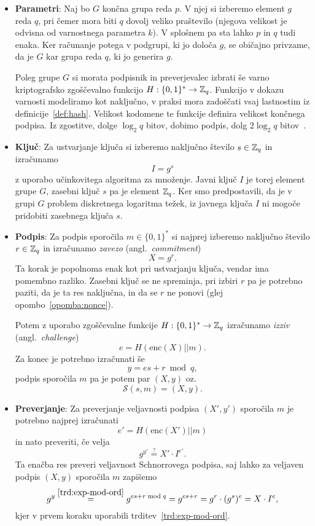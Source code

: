 \begin{itemize}
    \item \textbf{Parametri}:
    Naj bo $G$ končna grupa reda $p$. V njej si izberemo element $g$ reda $q$, pri čemer mora
    biti $q$ dovolj veliko praštevilo (njegova velikost je odvisna od varnostnega parametra $k$).
    V splošnem pa sta lahko $p$ in $q$ tudi enaka. Ker računanje potega v podgrupi, ki jo določa $g$,
    se običajno privzame, da je $G$ kar grupa reda $q$, ki jo generira $g$.

    Poleg grupe $G$ si morata podpisnik in preverjevalec izbrati še varno kriptografsko zgoščevalno
    funkcijo $H : \{0, 1\}^* \rightarrow \mathbb Z_q$. Funkcijo v dokazu varnosti modeliramo kot naključno,
    v praksi mora zadoščati vsaj lastnostim iz definicije~\ref{def:hash}. Velikost kodomene te funkcije
    definira velikost končnega podpisa. Iz zgostitve, dolge $\log_2 q$ bitov, dobimo podpis, dolg
    $2 \log_2 q$ bitov~\cite{stinson2023crypto}.
    \item \textbf{Ključ}:
    Za ustvarjanje ključa si izberemo naključno število $s \in \mathbb Z_q$ in izračunamo
    $$
    I = g^s
    $$
    z uporabo učinkovitega algoritma za množenje. Javni ključ $I$ je torej element grupe $G$, zasebni ključ
    $s$ pa je element $\mathbb Z_q$. Ker smo predpostavili, da je v grupi $G$ problem diskretnega logaritma
    težek, iz javnega ključa $I$ ni mogoče pridobiti zasebnega ključa $s$.

    \item \textbf{Podpis}:
    Za podpis sporočila $m \in \{0, 1\}^*$ si najprej izberemo naključno število $r \in \mathbb Z_q$ in izračunamo
    \textit{zavezo} (angl.\ \textit{commitment})
    $$
    X = g^r.
    $$
    Ta korak je popolnoma enak kot pri ustvarjanju ključa, vendar ima pomembno razliko. Zasebni
    ključ se ne spreminja, pri izbiri $r$ pa je potrebno paziti, da je ta res naključna, in da se
    $r$ ne ponovi (glej opombo~\ref{opomba:nonce}).

    Potem z uporabo zgoščevalne funkcije $H : \{0, 1\}^* \rightarrow \mathbb Z_q$ izračunamo \textit{izziv}
    (angl.\ \textit{challenge})
    $$
    e = H(\text{enc}(X) || m).
    $$
    Za konec je potrebno izračunati še
    $$ 
    y = es + r \bmod q,
    $$
    podpis sporočila $m$ pa je potem par $(X, y)$ oz.\
    $$ 
    \mathcal{S}(s, m) = (X, y).
    $$

    \item \textbf{Preverjanje}:
    Za preverjanje veljavnosti podpisa $(X', y')$ sporočila $m$ je potrebno najprej izračunati
    $$
    e' = H(\text{enc}(X') || m)
    $$
    in nato preveriti, če velja
    \begin{equation}
        g^{y'} \stackrel{?}{=} X' \cdot I^{e'}. \label{eq:gen-schnorr-ver}
    \end{equation}
    Ta enačba res preveri veljavnost Schnorrovega podpisa, saj lahko za veljaven podpis $(X, y)$
    sporočila $m$ zapišemo
    $$
    g^y \stackrel{\ref{trd:exp-mod-ord}}{=} g^{es + r \bmod q} = g^{es + r} = g^r \cdot (g^s)^e = X \cdot I^e,
    $$
    kjer v prvem koraku uporabili trditev~\ref{trd:exp-mod-ord}.
\end{itemize}

